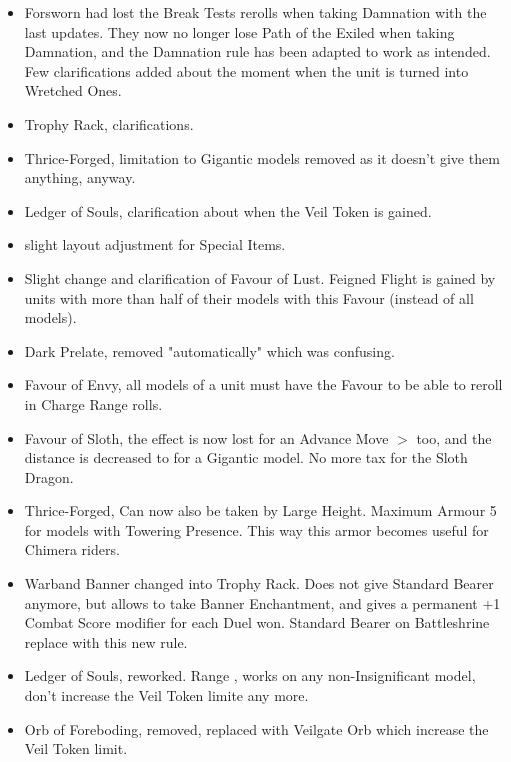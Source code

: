 

\subtitle{2.2.1}

\begin{itemize}
\item Forsworn had lost the Break Tests rerolls when taking Damnation with the last updates. They now no longer lose Path of the Exiled when taking Damnation, and the Damnation rule has been adapted to work as intended. Few clarifications added about the moment when the unit is turned into Wretched Ones.
\item Trophy Rack, clarifications.
\item Thrice-Forged, limitation to Gigantic models removed as it doesn't give them anything, anyway.
\item Ledger of Souls, clarification about when the Veil Token is gained.
\item slight layout adjustment for Special Items.
\item Slight change and clarification of Favour of Lust. Feigned Flight is gained by units with more than half of their models with this Favour (instead of all models).
\item Dark Prelate, removed "automatically" which was confusing.
\end{itemize}

\subtitle{2.2}

\subtitle{Redesign and rule changes}

\begin{itemize}
\item Favour of Envy, all models of a unit must have the Favour to be able to reroll  in Charge Range rolls.
\item Favour of Sloth, the effect is now lost for an Advance Move $>$ too, and the distance is decreased to  for a Gigantic model. No more tax for the Sloth Dragon.
\item Thrice-Forged, Can now also be taken by Large Height. Maximum Armour 5 for models with Towering Presence. This way this armor becomes useful for Chimera riders.
\item Warband Banner changed into Trophy Rack. Does not give Standard Bearer anymore, but allows to take Banner Enchantment, and gives a permanent +1 Combat Score modifier for each Duel won. Standard Bearer on Battleshrine replace with this new rule.
\item Ledger of Souls, reworked. Range , works on any non-Insignificant model, don't increase the Veil Token limite any more.
\item Orb of Foreboding, removed, replaced with Veilgate Orb which increase the Veil Token limit.
\end{itemize}

